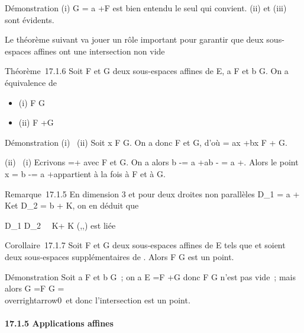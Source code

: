 \documentclass[]{article}
\begin{document}
Démonstration (i) G = a +\overrightarrow F est bien
entendu le seul qui convient. (ii) et (iii) sont évidents.

Le théorème suivant va jouer un rôle important pour garantir que deux
sous-espaces affines ont une intersection non vide

Théorème~17.1.6 Soit F et G deux sous-espaces affines de E, a \in F et b \in
G. On a équivalence de

\begin{itemize}
\itemsep1pt\parskip0pt
\item
  (i) F \bigcap G\neq~\varnothing~
\item
  (ii) \overrightarrowab
  \in\overrightarrow F
  +\overrightarrow G
\end{itemize}

Démonstration (i) \rigtharrow~(ii) Soit x \in F \bigcap G. On a donc
\overrightarrowax \in\overrightarrow
F et \overrightarrowxb
\in\overrightarrow G, d'où
\overrightarrowab =\overrightarrow
ax +\overrightarrow bx
\in\overrightarrow F +\overrightarrow
G.

(ii) \rigtharrow~(i) Ecrivons \overrightarrowab
=\overrightarrow \xi +\overrightarrow
\eta avec \overrightarrow\xi
\in\overrightarrow F et
\overrightarrow\eta \in\overrightarrow
G. On a alors b -\overrightarrow \eta = a
+\overrightarrow ab -\overrightarrow
\eta = a +\overrightarrow \xi. Alors le point x = b
-\overrightarrow \eta = a
+\overrightarrow \xi appartient à la fois à F et à G.

Remarque~17.1.5 En dimension 3 et pour deux droites non parallèles
D_1 = a + K\vecu et D_2 = b +
K\vecv, on en déduit que

D_1 \bigcap
D_2\neq~\varnothing~\mathrel\Leftrightarrow
\overrightarrowab \in K\vecu +
K\vecv \Leftrightarrow
(\overrightarrowab,\vecu,\vecv)\text
est liée 

Corollaire~17.1.7 Soit F et G deux sous-espaces affines de E tels que
\overrightarrowF et
\overrightarrowG soient deux sous-espaces
supplémentaires de \overrightarrowE. Alors F \bigcap G est
un point.

Démonstration Soit a \in F et b \in G~; on a
\overrightarrowab \in\overrightarrow
E =\overrightarrow F
+\overrightarrow G donc F \bigcap G n'est pas vide~; mais
alors \overrightarrowF \bigcap G
=\overrightarrow F \bigcap\overrightarrow
G =
\\overrightarrow0\
et donc l'intersection est un point.

\paragraph{17.1.5 Applications affines}
\end{document}
